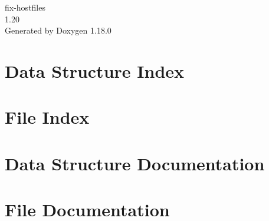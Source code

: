 \documentclass[twoside]{book}
\newcommand{\+}{\discretionary{\mbox{\scriptsize$\hookleftarrow$}}{}{}}
\newcommand{\clearemptydoublepage}{%
    \newpage{\pagestyle{empty}\cleardoublepage}%
  }
\begin{document}
  \raggedbottom
    \hypersetup{pageanchor=false,
                bookmarksnumbered=true,
                pdfencoding=unicode
               }
  \begin{titlepage}
  \vspace*{7cm}
  \begin{center}%
  {\Large fix-\/hostfiles}\\
  [1ex]\large 1.\+20 \\
  \vspace*{1cm}
  {\large Generated by Doxygen 1.18.0}\\
  \end{center}
  \end{titlepage}
  \clearemptydoublepage
  \tableofcontents
  \clearemptydoublepage
  \hypersetup{pageanchor=true}
\chapter{Data Structure Index}

\chapter{File Index}

\chapter{Data Structure Documentation}


\chapter{File Documentation}









  \backmatter
  \newpage
  \clearemptydoublepage
  \printindex
\end{document}
